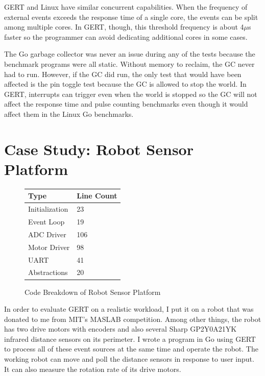 GERT and Linux have similar concurrent capabilities. When the frequency of external
events exceeds the response time of a single core, the events can be split among
multiple cores. In GERT, though, this threshold frequency is about 4$\mu$s faster
so the programmer can avoid dedicating additional cores in some cases.

The Go garbage collector was never an issue during any of the tests because the
benchmark programs were all static. Without memory to reclaim, the GC never
had to run. However, if the GC did run, the only test that would have been affected is
the pin toggle test because the GC is allowed to stop the world. In GERT, interrupts
can trigger even when the world is stopped so the GC will not affect the response time
and pulse counting benchmarks even though it would affect them in the Linux Go benchmarks.

\section{Case Study: Robot Sensor Platform} \label{sec:robot}

\begin{figure}[h]
\begin{center}
  \begin{tabular}{ | l | l |}
    \hline
    Type & Line Count \\ \hline
    Initialization & 23 \\ \hline
    Event Loop & 19 \\ \hline
    ADC Driver & 106 \\ \hline
    Motor Driver & 98 \\ \hline
    UART & 41 \\ \hline
    Abstractions & 20 \\
    \hline
  \end{tabular}
\end{center}
  \caption{Code Breakdown of Robot Sensor Platform} \label{fig:robot_code}
\end{figure}

In order to evaluate GERT on a realistic workload, I put it on a robot that was
donated to me from MIT's MASLAB competition. Among other things, the robot has two drive
motors with encoders and also several Sharp GP2Y0A21YK infrared distance sensors on its perimeter.
I wrote a program in Go using GERT to process all of these event sources at the same time
and operate the robot. The working robot can move and poll the distance sensors in response to user input.
It can also measure the rotation rate of its drive motors.


